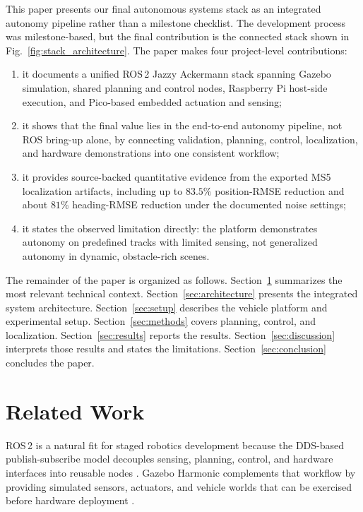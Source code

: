 \documentclass[conference]{IEEEtran}
\begin{document}
This paper presents our final autonomous systems stack as an
integrated autonomy pipeline rather than a milestone checklist. The development
process was milestone-based, but the final contribution is the connected stack
shown in Fig.~\ref{fig:stack_architecture}. The paper makes four project-level
contributions:

\begin{enumerate}
  \item it documents a unified ROS\,2 Jazzy Ackermann stack spanning Gazebo
        simulation, shared planning and control nodes, Raspberry Pi host-side
        execution, and Pico-based embedded actuation and sensing;
  \item it shows that the final value lies in the end-to-end autonomy pipeline,
        not ROS bring-up alone, by connecting validation, planning, control,
        localization, and hardware demonstrations into one consistent workflow;
  \item it provides source-backed quantitative evidence from the exported MS5
        localization artifacts, including up to $83.5\%$ position-RMSE
        reduction and about $81\%$ heading-RMSE reduction under the documented
        noise settings;
  \item it states the observed limitation directly: the platform demonstrates
        autonomy on predefined tracks with limited sensing, not generalized
        autonomy in dynamic, obstacle-rich scenes.
\end{enumerate}

The remainder of the paper is organized as follows. Section~\ref{sec:related}
summarizes the most relevant technical context. Section~\ref{sec:architecture}
presents the integrated system architecture. Section~\ref{sec:setup} describes
the vehicle platform and experimental setup. Section~\ref{sec:methods} covers
planning, control, and localization. Section~\ref{sec:results} reports the
results. Section~\ref{sec:discussion} interprets those results and states the
limitations. Section~\ref{sec:conclusion} concludes the paper.

\section{Related Work}
\label{sec:related}

ROS\,2 is a natural fit for staged robotics development because the DDS-based
publish-subscribe model decouples sensing, planning, control, and hardware
interfaces into reusable nodes \cite{ROS2JazzyDocs}. Gazebo Harmonic complements
that workflow by providing simulated sensors, actuators, and vehicle worlds that
can be exercised before hardware deployment \cite{GazeboHarmonicDocs}.
\end{document}
